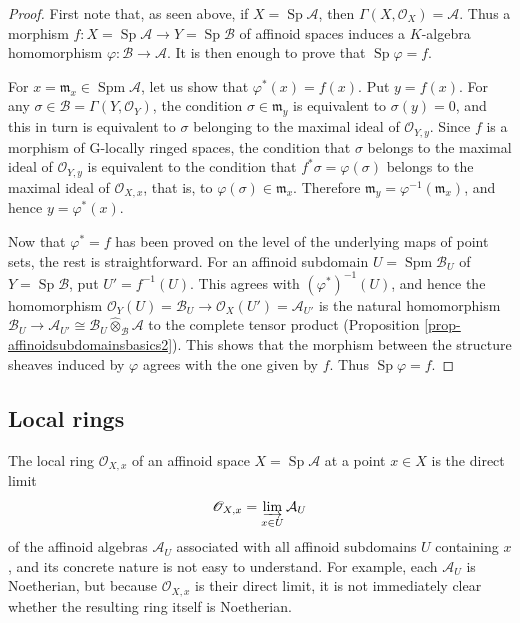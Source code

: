 \documentclass[a4paper,12pt, dvipdfmx]{jsbook}
\def\O{\mathscr{O}}
\def\m{\mathfrak{m}}
\def\Spm{\mathop{\mathrm{Spm}}\nolimits}
\def\Sp{\mathop{\mathrm{Sp}}\nolimits}
\theoremstyle{plain}
\theoremstyle{definition}
\begin{document}
\begin{proof}[Proof]
First note that, as seen above, if $X=\Sp\mathcal{A}$, then $\Gamma(X,\O_X)=\mathcal{A}$.
Thus a morphism $f\colon X=\Sp\mathcal{A}\rightarrow Y=\Sp\mathcal{B}$ of affinoid spaces induces a $K$-algebra homomorphism $\varphi\colon\mathcal{B}\rightarrow\mathcal{A}$.
It is then enough to prove that $\Sp\varphi=f$.

For $x=\m_x\in\Spm\mathcal{A}$, let us show that $\varphi^{\ast}(x)=f(x)$.
Put $y=f(x)$.
For any $\sigma\in\mathcal{B}=\Gamma(Y,\O_Y)$, the condition $\sigma\in\m_y$ is equivalent to $\sigma(y)=0$, and this in turn is equivalent to $\sigma$ belonging to the maximal ideal of $\O_{Y,y}$.
Since $f$ is a morphism of G-locally ringed spaces, the condition that $\sigma$ belongs to the maximal ideal of $\O_{Y,y}$ is equivalent to the condition that $f^{\ast}\sigma=\varphi(\sigma)$ belongs to the maximal ideal of $\O_{X,x}$, that is, to $\varphi(\sigma)\in\m_x$.
Therefore $\m_y=\varphi^{-1}(\m_x)$, and hence $y=\varphi^{\ast}(x)$.

Now that $\varphi^{\ast}=f$ has been proved on the level of the underlying maps of point sets, the rest is straightforward.
For an affinoid subdomain $U=\Spm\mathcal{B}_U$ of $Y=\Sp\mathcal{B}$, put $U'=f^{-1}(U)$.
This agrees with $(\varphi^{\ast})^{-1}(U)$, and hence the homomorphism $\O_Y(U)=\mathcal{B}_U\rightarrow\O_X(U')=\mathcal{A}_{U'}$ is the natural homomorphism $\mathcal{B}_U\rightarrow\mathcal{A}_{U'}\cong\mathcal{B}_U\widehat{\otimes}_{\mathcal{B}}\mathcal{A}$ to the complete tensor product (Proposition \ref{prop-affinoidsubdomainsbasics2}).
This shows that the morphism between the structure sheaves induced by $\varphi$ agrees with the one given by $f$.
Thus $\Sp\varphi=f$.
\end{proof}

\subsection{Local rings}\label{sub-localringsaffinoids}
The local ring $\O_{X,x}$ of an affinoid space $X=\Sp\mathcal{A}$ at a point $x\in X$ is the direct limit
$$
\O_{X,x}=\varinjlim_{x\in U}\mathcal{A}_U
$$
of the affinoid algebras $\mathcal{A}_U$ associated with all affinoid subdomains $U$ containing $x$, and its concrete nature is not easy to understand.
For example, each $\mathcal{A}_U$ is Noetherian, but because $\O_{X,x}$ is their direct limit, it is not immediately clear whether the resulting ring itself is Noetherian.
\end{document}
